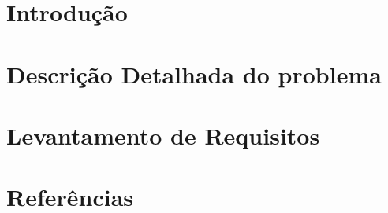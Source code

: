 \documentclass[11pt]{article}
\begin{document}


\newpage{}
\tableofcontents{}
\newpage{}

\section{Introdução}


\section{Descrição Detalhada do problema}


\section{Levantamento de Requisitos}


\section{Referências}

\end{document}
